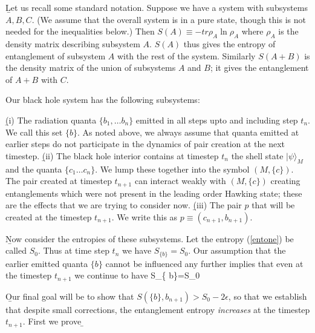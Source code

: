 \documentclass[12pt]{article}
\begin{document}
 
  \b

Let us recall some standard notation. Suppose we have a system with subsystems $A, B, C$. (We assume that the overall system is in a pure state, though this is not needed for the inequalities below.) Then $S(A)\equiv -tr \rho_A\ln \rho_A$  where $\rho_A$ is the density matrix describing subsystem $A$. $S(A)$ thus gives the entropy of entanglement of subsystem $A$ with the rest of the system. Similarly $S(A+B)$ is the density matrix of the union of subsystems $A$ and $B$; it gives the entanglement of $A+B$ with $C$.

Our black hole system has the following subsystems:

\b

(i) The radiation quanta $\{ b_1, \dots b_n \}$ emitted in all steps upto and including step $t_n$. We call this set  $\{ b\}$. As noted above, we always assume that quanta emitted at earlier steps do not participate in the dynamics of pair creation at the next timestep.
\b
(ii) The black hole interior contains at timestep $t_n$ the shell state $|\psi\rangle_M$ and the quanta $\{ c_1\dots c_n\}$. We lump these together into the symbol $(M, \{ c\})$. The pair created at timestep $t_{n+1}$ can interact weakly with $(M, \{c\})$ creating entanglements which were not present  in the leading order Hawking state;
these are the effects that we are trying to consider now.
\b
(iii) The pair $p$ that will be created at the timestep $t_{n+1}$. We write this as
$p\equiv (c_{n+1}, b_{n+1})$. 

\b

Now consider the entropies of these subsystems. 
 Let the entropy (\ref{entone}) be called $S_0$. Thus at time step $t_n$ we have
$
S_{\{ b\}}=S_0
$.
Our assumption that the earlier emitted quanta $\{ b\}$ cannot be influenced any further implies that even at the timestep $t_{n+1}$ we continue to have
\be
S_{\{ b\}}=S_0
\label{s0}
\ee

\b

Our final goal will be to show that $S(\{b\}, b_{n+1})>S_0 -2\epsilon$, so that we establish that despite small corrections, the entanglement entropy {\it increases} {\it} at the timestep $t_{n+1}$. First we prove
\b
 
\end{document}

